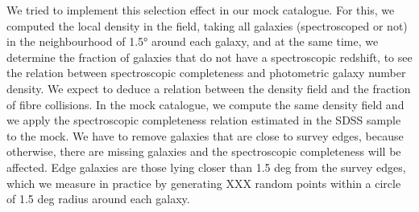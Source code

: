 We tried to implement this selection effect in our mock catalogue. For this, we
computed the local density in the field, taking all galaxies (spectroscoped or
not) in the neighbourhood of 1.5° around each galaxy, and at the same time, we
determine the fraction of galaxies that do not have a spectroscopic redshift,
to see the relation between spectroscopic completeness and photometric galaxy
number density. We expect to deduce a relation between the density field and
the fraction of fibre collisions. In the mock catalogue, we compute the same
density field and we apply the spectroscopic completeness relation estimated in
the SDSS sample to the mock. We have to remove galaxies that are close to
survey edges, because otherwise, there are missing galaxies and the
spectroscopic completeness will be affected. Edge galaxies are those lying
closer than 1.5 deg from the survey edges, which we measure in practice by
generating XXX random points within a circle of 1.5 deg radius around each
galaxy.

